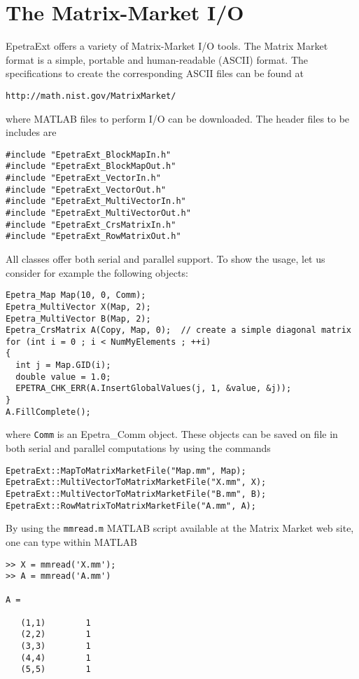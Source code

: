 \documentclass[11pt,relax]{SANDreport}
\begin{document}
\section{The Matrix-Market I/O}
\label{sec:mm}

EpetraExt offers a variety of Matrix-Market I/O tools.
The Matrix Market format is a simple, portable and human-readable (ASCII) 
format. The
specifications to create the corresponding ASCII files can be found at
\begin{verbatim}
http://math.nist.gov/MatrixMarket/
\end{verbatim}
where MATLAB files to perform I/O can be downloaded. 
The header files to be includes are
\begin{verbatim}
#include "EpetraExt_BlockMapIn.h"
#include "EpetraExt_BlockMapOut.h"
#include "EpetraExt_VectorIn.h"
#include "EpetraExt_VectorOut.h"
#include "EpetraExt_MultiVectorIn.h"
#include "EpetraExt_MultiVectorOut.h"
#include "EpetraExt_CrsMatrixIn.h"
#include "EpetraExt_RowMatrixOut.h"
\end{verbatim}
All classes offer both serial and parallel support.
To show the usage, let us consider for example the following objects:
\begin{verbatim}
Epetra_Map Map(10, 0, Comm);
Epetra_MultiVector X(Map, 2);
Epetra_MultiVector B(Map, 2);
Epetra_CrsMatrix A(Copy, Map, 0);  // create a simple diagonal matrix  
for (int i = 0 ; i < NumMyElements ; ++i)  
{
  int j = Map.GID(i);
  double value = 1.0;    
  EPETRA_CHK_ERR(A.InsertGlobalValues(j, 1, &value, &j));
}
A.FillComplete();
\end{verbatim}
where \verb!Comm! is an Epetra\_Comm object.
These objects can be saved on file
in both serial and parallel computations by using the commands
\begin{verbatim}
EpetraExt::MapToMatrixMarketFile("Map.mm", Map);
EpetraExt::MultiVectorToMatrixMarketFile("X.mm", X);
EpetraExt::MultiVectorToMatrixMarketFile("B.mm", B);
EpetraExt::RowMatrixToMatrixMarketFile("A.mm", A);
\end{verbatim}
By using the \verb!mmread.m! MATLAB
script available at the Matrix Market web site, one can type within MATLAB
\begin{verbatim}
>> X = mmread('X.mm');
>> A = mmread('A.mm')                                       

A =

   (1,1)        1
   (2,2)        1
   (3,3)        1
   (4,4)        1
   (5,5)        1
\end{verbatim}
\end{document}
